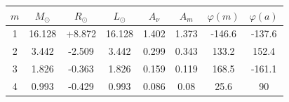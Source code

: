 \begin{table}[htbp]
    \centering
    \begin{tabular}{cccccccc}
        \toprule
        {$m$} & {$M_\odot$} & {$R_\odot$} & {$L_\odot$} & {$A_\nu$} & {$A_m$} & {$\varphi(m)$} & {$\varphi(a)$} \\ \midrule
        1  & 16.128 & +8.872 & 16.128 & 1.402 & 1.373 & -146.6 & -137.6 \\
        2  & 3.442  & -2.509 & 3.442  & 0.299 & 0.343 & 133.2  & 152.4  \\ \midrule
        3  & 1.826  & -0.363 & 1.826  & 0.159 & 0.119 & 168.5  & -161.1 \\
        4  & 0.993  & -0.429 & 0.993  & 0.086 & 0.08  & 25.6   & 90     \\ \bottomrule
    \end{tabular}
\end{table}